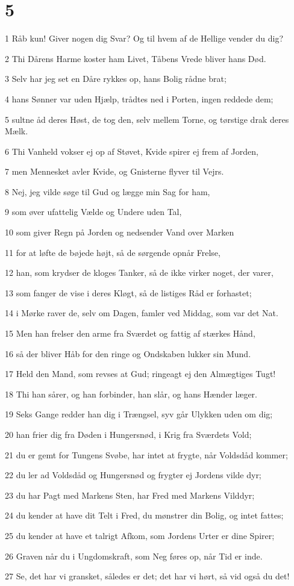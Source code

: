 \chapter{5}

\par 1 Råb kun! Giver nogen dig Svar? Og til hvem af de Hellige vender du dig?
\par 2 Thi Dårens Harme koster ham Livet, Tåbens Vrede bliver hans Død.
\par 3 Selv har jeg set en Dåre rykkes op, hans Bolig rådne brat;
\par 4 hans Sønner var uden Hjælp, trådtes ned i Porten, ingen reddede dem;
\par 5 sultne åd deres Høst, de tog den, selv mellem Torne, og tørstige drak deres Mælk.
\par 6 Thi Vanheld vokser ej op af Støvet, Kvide spirer ej frem af Jorden,
\par 7 men Mennesket avler Kvide, og Gnisterne flyver til Vejrs.
\par 8 Nej, jeg vilde søge til Gud og lægge min Sag for ham,
\par 9 som øver ufattelig Vælde og Undere uden Tal,
\par 10 som giver Regn på Jorden og nedsender Vand over Marken
\par 11 for at løfte de bøjede højt, så de sørgende opnår Frelse,
\par 12 han, som krydser de kloges Tanker, så de ikke virker noget, der varer,
\par 13 som fanger de vise i deres Kløgt, så de listiges Råd er forhastet;
\par 14 i Mørke raver de, selv om Dagen, famler ved Middag, som var det Nat.
\par 15 Men han frelser den arme fra Sværdet og fattig af stærkes Hånd,
\par 16 så der bliver Håb for den ringe og Ondskaben lukker sin Mund.
\par 17 Held den Mand, som revses at Gud; ringeagt ej den Almægtiges Tugt!
\par 18 Thi han sårer, og han forbinder, han slår, og hans Hænder læger.
\par 19 Seks Gange redder han dig i Trængsel, syv går Ulykken uden om dig;
\par 20 han frier dig fra Døden i Hungersnød, i Krig fra Sværdets Vold;
\par 21 du er gemt for Tungens Svøbe, har intet at frygte, når Voldsdåd kommer;
\par 22 du ler ad Voldsdåd og Hungersnød og frygter ej Jordens vilde dyr;
\par 23 du har Pagt med Markens Sten, har Fred med Markens Vilddyr;
\par 24 du kender at have dit Telt i Fred, du mønstrer din Bolig, og intet fattes;
\par 25 du kender at have et talrigt Afkom, som Jordens Urter er dine Spirer;
\par 26 Graven når du i Ungdomskraft, som Neg føres op, når Tid er inde.
\par 27 Se, det har vi gransket, således er det; det har vi hørt, så vid også du det!

